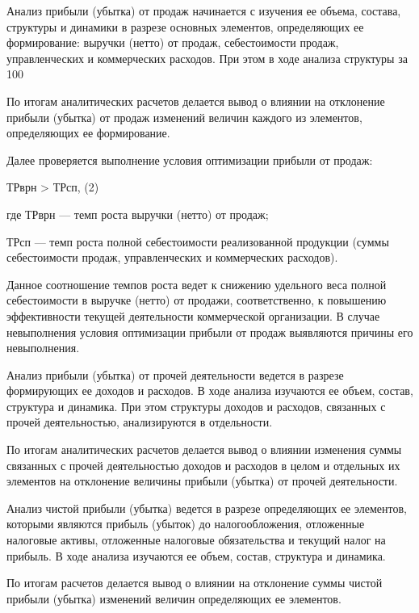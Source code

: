 Анализ прибыли (убытка) от продаж начинается с изучения ее объема, состава, структуры и динамики в разрезе основных элементов, определяющих ее формирование: выручки (нетто) от продаж, себестоимости продаж, управленческих и коммерческих расходов. При этом в ходе анализа структуры за 100%

По итогам аналитических расчетов делается вывод о влиянии на отклонение прибыли (убытка) от продаж изменений величин каждого из элементов, определяющих ее формирование.

Далее проверяется выполнение условия оптимизации прибыли от продаж:

ТРврн > ТРсп,        (2)

где ТРврн — темп роста выручки (нетто) от продаж;

ТРсп — темп роста полной себестоимости реализованной продукции (суммы себестоимости продаж, управленческих и коммерческих расходов).

Данное соотношение темпов роста ведет к снижению удельного веса полной себестоимости в выручке (нетто) от продажи, соответственно, к повышению эффективности текущей деятельности коммерческой организации. В случае невыполнения условия оптимизации прибыли от продаж выявляются причины его невыполнения.

Анализ прибыли (убытка) от прочей деятельности ведется в разрезе формирующих ее доходов и расходов. В ходе анализа изучаются ее объем, состав, структура и динамика. При этом структуры доходов и расходов, связанных с прочей деятельностью, анализируются в отдельности.

По итогам аналитических расчетов делается вывод о влиянии изменения суммы связанных с прочей деятельностью доходов и расходов в целом и отдельных их элементов на отклонение величины прибыли (убытка) от прочей деятельности.

Анализ чистой прибыли (убытка) ведется в разрезе определяющих ее элементов, которыми являются прибыль (убыток) до налогообложения, отложенные налоговые активы, отложенные налоговые обязательства и текущий налог на прибыль. В ходе анализа изучаются ее объем, состав, структура и динамика.

По итогам расчетов делается вывод о влиянии на отклонение суммы чистой прибыли (убытка) изменений величин определяющих ее элементов.
